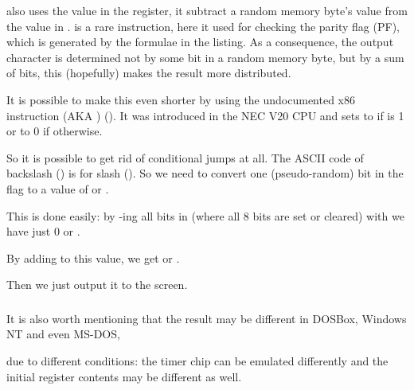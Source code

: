  also uses the value in the 
 register, it subtract a random memory byte's value from the  value in .
 is a rare instruction, here it used for checking the parity flag (PF), 
which is generated by the formulae in the listing.
As a consequence, the output character 
is determined not by some bit in a random memory byte, but by a sum of bits, 
this (hopefully) makes the result more distributed.

It is possible to 
make this even shorter by using the undocumented x86 instruction  (\ac{AKA} ) ().
It was introduced in the NEC V20 \ac{CPU} and sets  to 
 if  is 1 or to 0 if otherwise.



So it is possible to get rid of conditional jumps at all.
The \ac{ASCII} code of backslash (\q{\textbackslash{}}) 
is  \AndENRU {} for slash (\q{/}).
So we need to convert one (pseudo-random) bit in the  flag to a value of  or .%


This is done easily: by -ing all bits in  (where all 8 bits are set or cleared) with  we have just 0 or .%


By adding  to this value, we get  or .%

Then we just output it to the screen.

\subsubsection{\Conclusion{}}

It is also worth mentioning that the result may 
be different in DOSBox, \gls{Windows NT} and even MS-DOS, 

due to different
conditions: the timer chip can be emulated differently and the initial register contents may be different as well.
